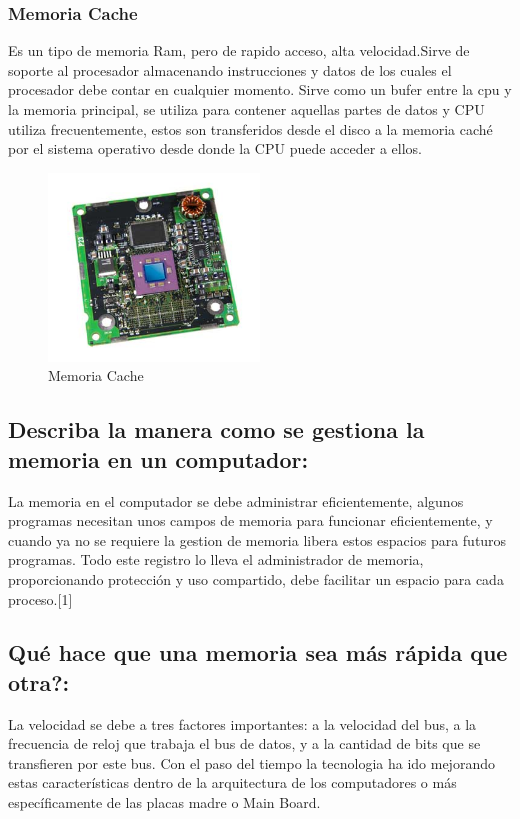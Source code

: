 \documentclass{article}
\begin{document}
\subsubsection{Memoria Cache}
 Es un tipo de memoria Ram, pero de rapido acceso, alta velocidad.Sirve de soporte al procesador almacenando instrucciones y datos de los cuales el procesador debe contar en cualquier momento. Sirve como un bufer entre la cpu y la memoria principal, se utiliza para contener aquellas partes de datos y CPU utiliza frecuentemente, estos son transferidos desde el disco a la memoria caché por el sistema operativo desde donde la CPU puede acceder a ellos.
 \begin{figure}[h]
\caption{Memoria Cache}
\centering
\includegraphics[width=0.5\textwidth]{cache}
\end{figure}
\subsection{Describa la manera como se gestiona la memoria en un computador:}
La memoria en el computador se debe administrar eficientemente, algunos programas necesitan unos campos de memoria para funcionar eficientemente, y cuando ya no se requiere la gestion de memoria libera estos espacios para futuros programas.
Todo este registro lo lleva el administrador de memoria, proporcionando protección y uso compartido, debe facilitar un espacio para cada proceso.[1]
\subsection{Qué hace que una memoria sea más rápida que otra?:}
La velocidad se debe a tres factores importantes: a la velocidad del bus, a la frecuencia de reloj que trabaja el bus de datos, y a la cantidad de bits que se transfieren por este bus. Con el paso del tiempo la tecnologia ha ido mejorando estas características dentro de la arquitectura de los computadores o más específicamente de las placas madre o Main Board.
\end{document}
